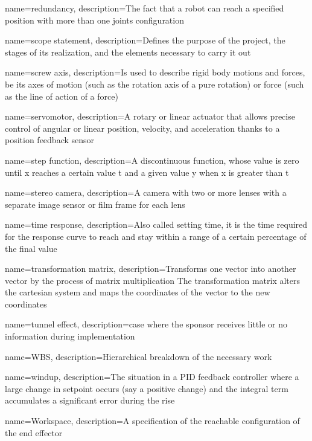 {
    name=redundancy,
    description={The fact that a robot can reach a specified position with more than one joints configuration}
}

{
    name=scope statement,
    description={Defines the purpose of the project, the stages of its realization, and the elements necessary to carry it out}
}

{
    name=screw axis,
    description={Is used to describe rigid body motions and forces, be its axes of motion (such as the rotation axis of a pure rotation) or force (such as the line of action of a force)}
}

{
    name=servomotor,
    description={A rotary or linear actuator that allows precise control of angular or linear position, velocity, and acceleration thanks to a position feedback sensor}
}

{
    name=step function,
    description={A discontinuous function, whose value is zero until x reaches a certain value t and a given value y when x is greater than t}
}

{
    name=stereo camera,
    description={A camera with two or more lenses with a separate image sensor or film frame for each lens}
}

{
    name=time response,
    description={Also called setting time, it is the time required for the response curve to reach and stay within a range of a certain percentage of the final value}
}

{
    name=transformation matrix,
    description={Transforms one vector into another vector by the process of matrix multiplication The transformation matrix alters the cartesian system and maps the coordinates of the vector to the new coordinates}
}

{
    name=tunnel effect,
    description={case where the sponsor receives little or no information during implementation}
}

{
    name=WBS,
    description={Hierarchical breakdown of the necessary work}
}

{
    name=windup,
    description={The situation in a PID feedback controller where a large change in setpoint occurs (say a positive change) and the integral term accumulates a significant error during the rise}
}

{
    name=Workspace,
    description={A specification of the reachable configuration of the end effector}
}